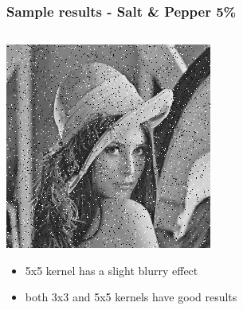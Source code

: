 \documentclass{beamer}
\begin{document}
	\begin{frame}[t,fragile]
		\frametitle{Sample results - Salt \& Pepper 5\%}
		
		\begin{columns}[onlytextwidth]
			\begin{column}{0.3\textwidth}
				\includegraphics[width=\textwidth]{img/original5.jpg}
				\vspace{3.5mm}
				\scriptsize
				\begin{itemize}
					\item 5x5 kernel has a slight blurry effect
					\item both 3x3 and 5x5 kernels have good results
				\end{itemize}
			\end{column}


\end{columns}
\end{frame}
\end{document}
